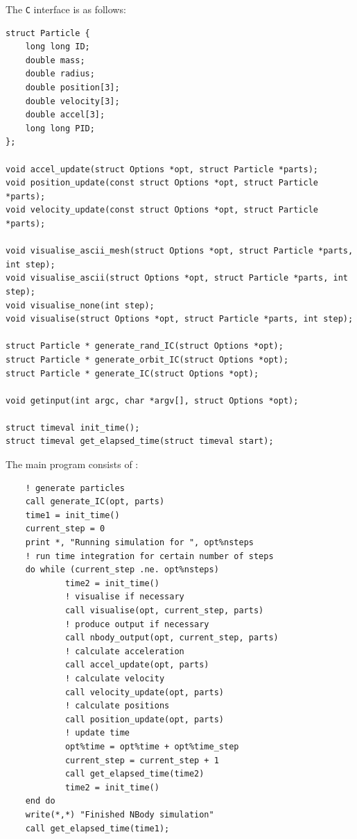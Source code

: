 The \texttt{C} interface is as follows:
\begin{center}
\begin{minipage}{0.95\textwidth}
\small
\begin{verbatim}
struct Particle {
    long long ID;
    double mass;   
    double radius;
    double position[3];
    double velocity[3]; 
    double accel[3];    
    long long PID;
};

void accel_update(struct Options *opt, struct Particle *parts);
void position_update(const struct Options *opt, struct Particle *parts);
void velocity_update(const struct Options *opt, struct Particle *parts);

void visualise_ascii_mesh(struct Options *opt, struct Particle *parts, int step);
void visualise_ascii(struct Options *opt, struct Particle *parts, int step);
void visualise_none(int step);
void visualise(struct Options *opt, struct Particle *parts, int step);

struct Particle * generate_rand_IC(struct Options *opt);
struct Particle * generate_orbit_IC(struct Options *opt);
struct Particle * generate_IC(struct Options *opt);

void getinput(int argc, char *argv[], struct Options *opt);

struct timeval init_time();
struct timeval get_elapsed_time(struct timeval start);

\end{verbatim}
\end{minipage}
\end{center}


\newpage
The main program consists of : 
\begin{center}
\begin{minipage}{0.95\textwidth}
\begin{verbatim}
    ! generate particles 
    call generate_IC(opt, parts)
    time1 = init_time()
    current_step = 0
    print *, "Running simulation for ", opt%nsteps
    ! run time integration for certain number of steps
    do while (current_step .ne. opt%nsteps)
            time2 = init_time()
            ! visualise if necessary 
            call visualise(opt, current_step, parts)
            ! produce output if necessary 
            call nbody_output(opt, current_step, parts)
            ! calculate acceleration 
            call accel_update(opt, parts)
            ! calculate velocity 
            call velocity_update(opt, parts)
            ! calculate positions 
            call position_update(opt, parts)
            ! update time 
            opt%time = opt%time + opt%time_step
            current_step = current_step + 1
            call get_elapsed_time(time2)
            time2 = init_time()
    end do 
    write(*,*) "Finished NBody simulation"
    call get_elapsed_time(time1);
\end{verbatim}
\end{minipage}
\end{center}

